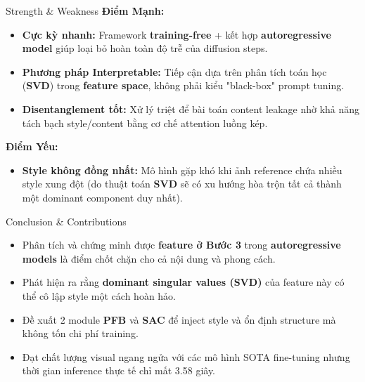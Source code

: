 \documentclass[aspectratio=169, 10pt]{beamer}
\begin{document}
	\begin{frame}{Strength \& Weakness}
		\textbf{Điểm Mạnh:}
		\begin{itemize}
			\item \textbf{Cực kỳ nhanh:} Framework \textbf{training-free} + kết hợp \textbf{autoregressive model} giúp loại bỏ hoàn toàn độ trễ của diffusion steps.
			\item \textbf{Phương pháp Interpretable:} Tiếp cận dựa trên phân tích toán học (\textbf{SVD}) trong \textbf{feature space}, không phải kiểu "black-box" prompt tuning.
			\item \textbf{Disentanglement tốt:} Xử lý triệt để bài toán content leakage nhờ khả năng tách bạch style/content bằng cơ chế attention luồng kép.
		\end{itemize}
		\vspace{0.3cm}
		\textbf{Điểm Yếu:}
		\begin{itemize}
			\item \textbf{Style không đồng nhất:} Mô hình gặp khó khi ảnh reference chứa nhiều style xung đột (do thuật toán \textbf{SVD} sẽ có xu hướng hòa trộn tất cả thành một dominant component duy nhất).
		\end{itemize}
	\end{frame}
	
	\begin{frame}{Conclusion \& Contributions}
		\begin{itemize}
			\item Phân tích và chứng minh được \textbf{feature ở Bước 3} trong \textbf{autoregressive models} là điểm chốt chặn cho cả nội dung và phong cách.
			\item Phát hiện ra rằng \textbf{dominant singular values (SVD)} của feature này có thể cô lập style một cách hoàn hảo.
			\item Đề xuất 2 module \textbf{PFB} và \textbf{SAC} để inject style và ổn định structure mà không tốn chi phí training.
			\item Đạt chất lượng visual ngang ngửa với các mô hình SOTA fine-tuning nhưng thời gian inference thực tế chỉ mất 3.58 giây.
		\end{itemize}
	\end{frame}
	
\end{document}
